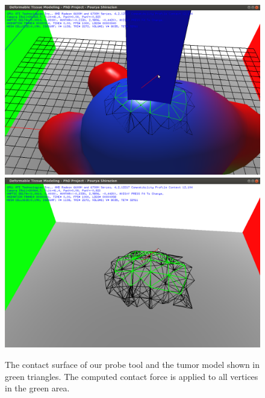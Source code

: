 \begin{figure}[H]
  \centering
  \includegraphics[width=0.45\linewidth]{figures/deformable/shots/1ring01.png}
  \includegraphics[width=0.45\linewidth]{figures/deformable/shots/1ring03.png}
 
  \caption{\label{fig:1ring}
  {The contact surface of our probe tool and the tumor model shown in green triangles. The computed 
  contact force is applied to all vertices in the green area.}
}
\end{figure}





















